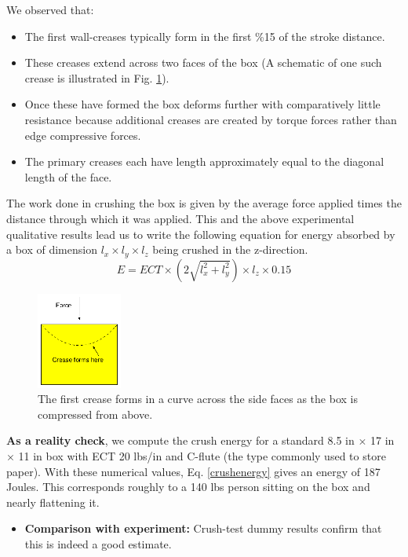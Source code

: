 \documentclass[12pt,a4paper,titlepage]{article}
\begin{document}
We observed that:
\begin{itemize}
\item The first wall-creases typically form in the first \%15 of the stroke distance.
\item These creases extend across two faces of the box (A schematic of one such crease is illustrated in Fig. \ref{creases}).
\item Once these have formed the box deforms further with comparatively little resistance because
 additional creases are created by torque forces rather than edge compressive forces.
\item The primary creases each have length approximately equal to the diagonal length of the face.
\end{itemize}
The work done in crushing the box is given by the average force applied times the distance through which it was applied.
This and the above experimental qualitative results lead us to write the following equation for energy absorbed by a box of dimension
$l_x \times l_y \times l_z$ being crushed in the z-direction.
\begin{equation}\label{crushenergy}
E = ECT \times \left(2\sqrt{l_x^2 +l_y^2}\right) \times l_z \times 0.15
\end{equation}

\begin{figure}
\caption{\label{creases} The first crease forms in a curve across the side faces as the box is compressed from above.}
\begin{center}
\includegraphics[width=0.25\textwidth]{crease.eps}
\end{center}
\end{figure}

{\bf As a reality check}, we compute the crush energy for a standard 8.5 in $\times$  17 in $\times$ 11 in box with ECT 20
lbs/in and C-flute (the type commonly used to store paper).  With these numerical values, Eq. \ref{crushenergy}
gives an energy of 187 Joules. This corresponds roughly to a 140 lbs person sitting on the box and nearly flattening it.
\begin{itemize}
\item {\bf Comparison with experiment:} Crush-test dummy results confirm that this is indeed a good estimate.
\end{itemize}
\end{document}
